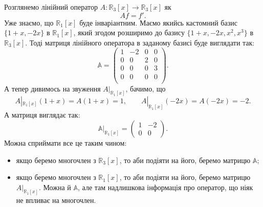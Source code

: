 \documentclass{math_library}
\begin{document}
\begin{example}
Розглянемо лінійний оператор $A \colon \mathbb{R}_3[x] \to \mathbb{R}_3[x]$ як 
\[
Af = f'.
\]
Уже знаємо, що $\mathbb{R}_1[x]$ буде інваріантним. Маємо якийсь кастомний базис $\{1+x,-2x\}$ в $\mathbb{R}_1[x]$, який згодом розширимо до базису $\{1+x,-2x,x^2,x^3\}$ в $\mathbb{R}_3[x]$.
Тоді матриця лінійного оператора в заданому базисі буде виглядати так:
\[
\mathbb{A} = \begin{pmatrix}
1 & -2 & 0 & 0 \\
0 & 0 & 2 & 0 \\
0 & 0 & 0 & 3 \\
0 & 0 & 0 & 0 \\
\end{pmatrix}.
\]
А тепер дивимось на звуження $A|_{\mathbb{R}_1[x]}$, бачимо, що
\[
A|_{\mathbb{R}_1[x]}(1+x) = A(1+x) = 1, \qquad A|_{\mathbb{R}_1[x]}(-2x) = A(-2x) = -2.
\]
А матриця виглядає так:
\[
\mathbb{A}|_{\mathbb{R}_1[x]} = \begin{pmatrix}
1 & -2 \\
0 & 0
\end{pmatrix}.
\]
Можна сприймати все це таким чином:
\begin{itemize}[nosep,wide=0pt,label={--}]
\item якщо беремо многочлен з $\mathbb{R}_3[x]$, то аби подіяти на його, беремо матрицю $\mathbb{A}$;
\item якщо беремо многочлен з $\mathbb{R}_1[x]$, то аби подіяти на його, беремо матрицю $A|_{\mathbb{R}_1[x]}$. Можна й $\mathbb{A}$, але там надлишкова інформація про оператор, що ніяк не впливає на многочлен.
\end{itemize}
\end{example}
\end{document}

